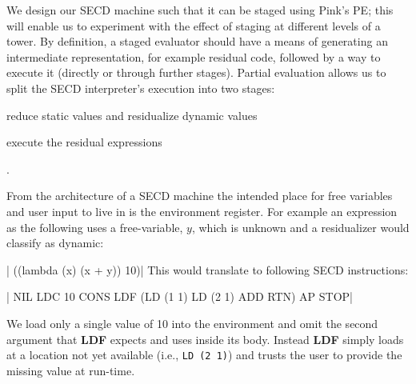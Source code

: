 \documentclass[a4paper,12pt,twoside,openright]{report}
\theoremstyle{definition}
\begin{document}
We design our SECD machine such that it can be staged using Pink's PE; this will enable us to experiment with the effect of staging at different levels of a tower. By definition, a staged evaluator should have a means of generating an intermediate representation, for example residual code, followed by a way to execute it (directly or through further stages). Partial evaluation allows us to split the SECD interpreter's execution into two stages:
\begin{enumerate*}[label=(\arabic*)]
    \item reduce static values and residualize dynamic values
    \item execute the residual expressions
\end{enumerate*}.

From the architecture of a SECD machine the intended place for free variables and user input to live in is the environment register. For example an expression as the following uses a free-variable, $y$, which is unknown and a residualizer would classify as dynamic:

|    ((lambda (x) (x + y)) 10)|
This would translate to following SECD instructions:

|   NIL LDC 10 CONS LDF (LD (1 1) LD (2 1) ADD RTN) AP STOP|

We load only a single value of 10 into the environment and omit the second argument that \textbf{LDF} expects and uses inside its body. Instead \textbf{LDF} simply loads at a location not yet available (i.e., \mbox{\texttt{LD (2 1)}}) and trusts the user to provide the missing value at run-time.
\end{document}
